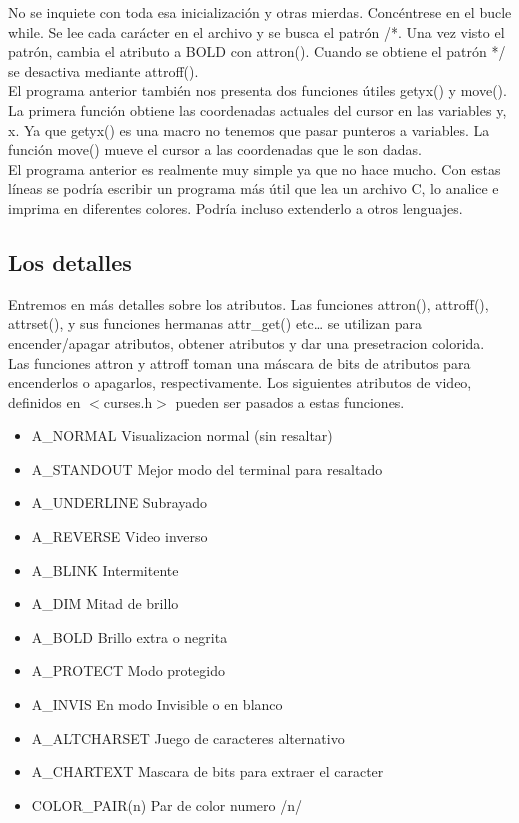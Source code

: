 \documentclass{article}
\newcommand\tab[1][1cm]{\hspace*{#1}}
\begin{document}
No se inquiete con toda esa inicialización y otras mierdas. Concéntrese en el
bucle while. Se lee cada carácter en el archivo y se busca el patrón /*. Una
vez visto el patrón, cambia el atributo a BOLD con attron(). Cuando se obtiene
el patrón */ se desactiva mediante attroff().\\

El programa anterior también nos presenta dos funciones útiles getyx() y
move(). La primera función obtiene las coordenadas actuales del cursor en las
variables y, x. Ya que getyx() es una macro no tenemos que pasar punteros a
variables. La función move() mueve el cursor a las coordenadas que le son
dadas.\\

El programa anterior es realmente muy simple ya que no hace mucho. Con estas
líneas se podría escribir un programa más útil que lea un archivo C, lo analice
e imprima en diferentes colores. Podría incluso extenderlo a otros lenguajes.\\

\subsection{Los detalles}%
Entremos en más detalles sobre los atributos. Las funciones attron(),
attroff(), attrset(), y sus funciones hermanas attr\_get() etc… se utilizan
para encender/apagar atributos, obtener atributos y dar una presetracion
colorida.\\

Las funciones attron y attroff toman una máscara de bits de atributos para
encenderlos o apagarlos, respectivamente. Los siguientes atributos de video,
definidos en $<$curses.h$>$ pueden ser pasados a estas funciones.

\begin{itemize}
  \item A\_NORMAL \tab Visualizacion normal (sin resaltar)
  \item A\_STANDOUT \tab Mejor modo del terminal para resaltado
  \item A\_UNDERLINE \tab Subrayado
  \item A\_REVERSE \tab Video inverso
  \item A\_BLINK \tab Intermitente
  \item A\_DIM \tab Mitad de brillo
  \item A\_BOLD \tab Brillo extra o negrita
  \item A\_PROTECT \tab Modo protegido
  \item A\_INVIS \tab En modo Invisible o en blanco
  \item A\_ALTCHARSET \tab Juego de caracteres alternativo
  \item A\_CHARTEXT \tab Mascara de bits para extraer el caracter
  \item COLOR\_PAIR(n) \tab Par de color numero /n/
\end{itemize}
\end{document}
